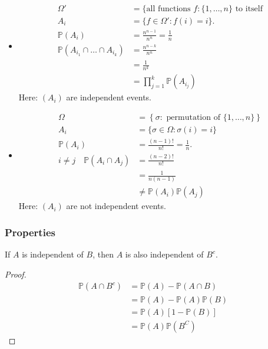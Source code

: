\begin{example}[Independence] ~\vspace*{-1.5\baselineskip}
    \begin{itemize}
        \item \begin{align*}
            \Omega' &= \{\text{all functions } f : \{1, \dots, n\} \text{ to itself} \\
            A_i &= \{f \in \Omega' : f(i) = i\}. \\
            \mathbb{P}(A_i) &= \frac{n^{n -1}}{n^n} = \frac{1}{n} \\
            \mathbb{P}(A_{i_1} \cap \dots \cap A_{i_k}) &= \frac{n^{n -k}}{n^n} \\
            &= \frac{1}{n^k} \\
            &= \prod_{j = 1}^k \mathbb{P}(A_{i_j})
        \end{align*} 
        Here: $(A_i)$ are independent events.
        \item \begin{align*}
            \Omega &= \left\{\sigma : \text{ permutation of } \{1, \dots, n\} \right\} \\
            A_i &= \{ \sigma \in \Omega : \sigma(i) = i \} \\
            \mathbb{P}(A_i) &= \frac{(n - 1)!}{n!} = \frac{1}{n}. \\
            i \neq j \quad \mathbb{P}(A_i \cap A_j) &= \frac{(n - 2)!}{n!} \\
            &= \frac{1}{n(n - 1)} \\
            &\neq \mathbb{P}(A_i) \mathbb{P}(A_j)
        \end{align*} 
        Here: $(A_i)$ are not independent events.
    \end{itemize} 
\end{example} 

\subsubsection{Properties}
\begin{claim}
    If $A$ is independent of $B$, then $A$ is also independent of $B^c$.
\end{claim} 

\begin{proof}
    \begin{align*}
        \mathbb{P}(A \cap B^c) &= \mathbb{P}(A) - \mathbb{P}(A \cap B) \\
        &= \mathbb{P}(A) - \mathbb{P}(A)\mathbb{P}(B) \\
        &= \mathbb{P}(A) [1 - \mathbb{P}(B)] \\
        &= \mathbb{P}(A) \mathbb{P}(B^C)
    \end{align*}  
\end{proof} 

